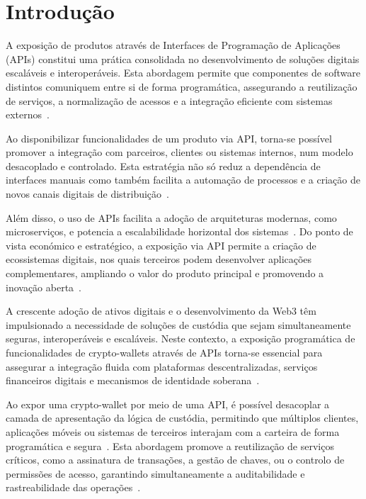 \newpage
\section{Introdução}
A exposição de produtos através de Interfaces de Programação de Aplicações (APIs) constitui uma prática consolidada no desenvolvimento de soluções digitais escaláveis e interoperáveis. Esta abordagem permite que componentes de software distintos comuniquem entre si de forma programática, assegurando a reutilização de serviços, a normalização de acessos e a integração eficiente com sistemas externos~\cite{fielding2000, papazoglou2008}.

Ao disponibilizar funcionalidades de um produto via API, torna-se possível promover a integração com parceiros, clientes ou sistemas internos, num modelo desacoplado e controlado. Esta estratégia não só reduz a dependência de interfaces manuais como também facilita a automação de processos e a criação de novos canais digitais de distribuição~\cite{rodrigues2020}.

Além disso, o uso de APIs facilita a adoção de arquiteturas modernas, como microserviços, e potencia a escalabilidade horizontal dos sistemas~\cite{newman2015}. Do ponto de vista económico e estratégico, a exposição via API permite a criação de ecossistemas digitais, nos quais terceiros podem desenvolver aplicações complementares, ampliando o valor do produto principal e promovendo a inovação aberta~\cite{ibm_api_economy, o2016}.

A crescente adoção de ativos digitais e o desenvolvimento da Web3 têm impulsionado a necessidade de soluções de custódia que sejam simultaneamente seguras, interoperáveis e escaláveis. Neste contexto, a exposição programática de funcionalidades de crypto-wallets através de APIs torna-se essencial para assegurar a integração fluida com plataformas descentralizadas, serviços financeiros digitais e mecanismos de identidade soberana~\cite{antonopoulos2017, vanwirdum2021}.

Ao expor uma crypto-wallet por meio de uma API, é possível desacoplar a camada de apresentação da lógica de custódia, permitindo que múltiplos clientes, aplicações móveis ou sistemas de terceiros interajam com a carteira de forma programática e segura~\cite{gudgeon2020}. Esta abordagem promove a reutilização de serviços críticos, como a assinatura de transações, a gestão de chaves, ou o controlo de permissões de acesso, garantindo simultaneamente a auditabilidade e rastreabilidade das operações~\cite{bonneau2015}.

